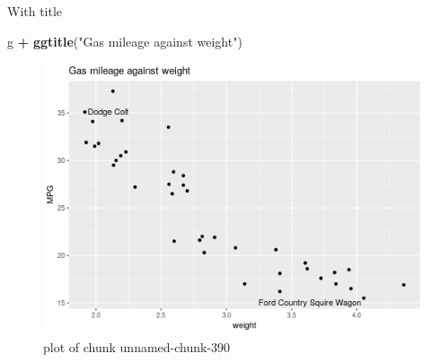 \documentclass[ignorenonframetext,]{beamer}
\newenvironment{Shaded}{\begin{snugshade}}{\end{snugshade}}
\newcommand{\KeywordTok}[1]{\textcolor[rgb]{0.13,0.29,0.53}{\textbf{#1}}}
\newcommand{\NormalTok}[1]{#1}
\newcommand{\OperatorTok}[1]{\textcolor[rgb]{0.81,0.36,0.00}{\textbf{#1}}}
\newcommand{\StringTok}[1]{\textcolor[rgb]{0.31,0.60,0.02}{#1}}
\begin{document}
\begin{frame}[fragile]{With title}
\protect\hypertarget{with-title}{}

\begin{Shaded}
\begin{Highlighting}[]
\NormalTok{g }\OperatorTok{+}\StringTok{ }\KeywordTok{ggtitle}\NormalTok{(}\StringTok{"Gas mileage against weight"}\NormalTok{)}
\end{Highlighting}
\end{Shaded}

\begin{figure}
\centering
\includegraphics{figure/unnamed-chunk-390-1.png}
\caption{plot of chunk unnamed-chunk-390}
\end{figure}

\end{frame}
\end{document}
